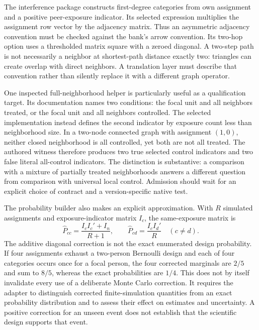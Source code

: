 The interference package constructs first-degree categories from own assignment and a positive peer-exposure indicator. Its selected expression multiplies the assignment row vector by the adjacency matrix. Thus an asymmetric adjacency convention must be checked against the bank's arrow convention. Its two-hop option uses a thresholded matrix square with a zeroed diagonal. A two-step path is not necessarily a neighbor at shortest-path distance exactly two: triangles can create overlap with direct neighbors. A translation layer must describe that convention rather than silently replace it with a different graph operator.\citep{exec25_rnet_exposure}

One inspected full-neighborhood helper is particularly useful as a qualification target. Its documentation names two conditions: the focal unit and all neighbors treated, or the focal unit and all neighbors controlled. The selected implementation instead defines the second indicator by exposure count less than neighborhood size. In a two-node connected graph with assignment $(1,0)$, neither closed neighborhood is all controlled, yet both are not all treated. The authored witness therefore produces two true selected control indicators and two false literal all-control indicators. The distinction is substantive: a comparison with a mixture of partially treated neighborhoods answers a different question from comparison with universal local control. Admission should wait for an explicit choice of contract and a version-specific native test.\citep{exec25_rnet_exposure,exec25_rnet_choice}

The probability builder also makes an explicit approximation. With $R$ simulated assignments and exposure-indicator matrix $I_c$, the same-exposure matrix is
\[
 \widehat P_{cc}=\frac{I_cI_c'+I_n}{R+1},
 \qquad
 \widehat P_{cd}=\frac{I_cI_d'}{R}\quad(c\ne d).
\]
The additive diagonal correction is not the exact enumerated design probability. If four assignments exhaust a two-person Bernoulli design and each of four categories occurs once for a focal person, the four corrected marginals are $2/5$ and sum to $8/5$, whereas the exact probabilities are $1/4$. This does not by itself invalidate every use of a deliberate Monte Carlo correction. It requires the adapter to distinguish corrected finite-simulation quantities from an exact probability distribution and to assess their effect on estimates and uncertainty. A positive correction for an unseen event does not establish that the scientific design supports that event.\citep{exec25_rnet_exposure,exec25_rnet_choice}

